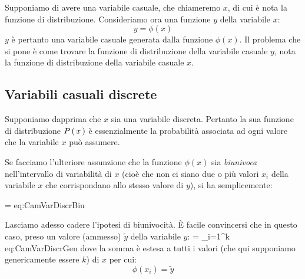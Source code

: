 \label{sec:Cambiamento Variabile} Supponiamo di avere una variabile casuale, che
chiameremo $x$, di cui \`e nota la funzione di  distribuzione.
Consideriamo ora una funzione $y$ della variabile $x$: 
$$
y = \phi(x)
$$
$y$ \`e pertanto una variabile casuale generata dalla funzione $\phi(x)$.
Il problema che si pone \`e come trovare la funzione di distribuzione
della variabile casuale $y$, nota la funzione di distribuzione della variabile
casuale $x$. 

\subsection{Variabili casuali discrete}

Supponiamo dapprima che $x$ sia una variabile discreta. Pertanto la
sua funzione di distribuzione $\displaystyle P\left(\, x \, \right)$ \`e essenzialmente la probabilit\`a
associata ad ogni valore che la variabile $x$ pu\`o assumere.

Se facciamo l'ulteriore assunzione che la funzione $\phi(x)$ sia
\emph{biunivoca} nell'intervallo di variabilit\`a di $x$ (cio\`e che non ci
siano due o pi\`u valori $x_i$ della variabile $x$ che corrispondano allo
stesso valore di $y$), si ha semplicemente:

\eqnlbox
{ = }
{eq:CamVarDiscrBiu}

\begin{exemplify}

\end{exemplify}

Lasciamo adesso cadere l'ipotesi di biunivocit\`a. \`E facile convincersi che
in questo caso, preso un valore (ammesso) $\tilde y$ della variabile $y$:
\eqnlbox
{ = \sum_{i=1}^{k} }
{eq:CamVarDiscrGen}
dove la somma \`e estesa a tutti i valori (che qui supponiamo genericamente
essere $k$) di $x$ per cui:
$$
\phi(x_i) = \tilde y
$$

